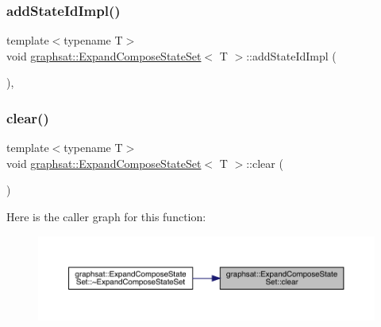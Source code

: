\subsubsection{\texorpdfstring{addStateIdImpl()}{addStateIdImpl()}}
{\footnotesize\ttfamily template$<$typename T$>$ \\
void \mbox{\hyperlink{classgraphsat_1_1_expand_compose_state_set}{graphsat\+::\+Expand\+Compose\+State\+Set}}$<$ T $>$\+::add\+State\+Id\+Impl (\begin{DoxyParamCaption}{ }\end{DoxyParamCaption})\hspace{0.3cm}{\ttfamily [inline]}, {\ttfamily [protected]}}

\mbox{\label{classgraphsat_1_1_expand_compose_state_set_a4478c7c058e694b717db1fe820614f0a}} 
\subsubsection{\texorpdfstring{clear()}{clear()}}
{\footnotesize\ttfamily template$<$typename T$>$ \\
void \mbox{\hyperlink{classgraphsat_1_1_expand_compose_state_set}{graphsat\+::\+Expand\+Compose\+State\+Set}}$<$ T $>$\+::clear (\begin{DoxyParamCaption}{ }\end{DoxyParamCaption})\hspace{0.3cm}{\ttfamily [inline]}}

Here is the caller graph for this function\+:\nopagebreak
\begin{figure}[H]
\begin{center}
\leavevmode
\includegraphics[width=350pt]{classgraphsat_1_1_expand_compose_state_set_a4478c7c058e694b717db1fe820614f0a_icgraph}
\end{center}
\end{figure}
\mbox{\label{classgraphsat_1_1_expand_compose_state_set_a4c014106669978321e07e0c9b7783479}} 
